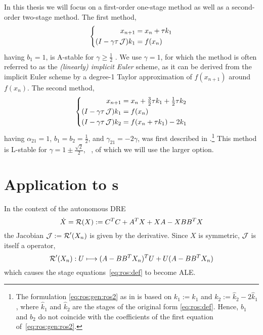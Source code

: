 In this thesis we will focus on a first-order one-stage method as well as a second-order two-stage method.
The first method, 
\begin{equation}
\label{eq:ros:gen:ros1}
\left\{
\begin{aligned}
  x_{n+1} &= x_n + \tau k_1 \\
  (I - \gamma\tau \operatorname{\mathcal J}) k_1 &= f(x_n)
\end{aligned}
\right.
\end{equation}
having $b_1=1$,
is A-stable for $\gamma \geq \frac{1}{2}$ \cite[Table~6.3]{HairerWanner2}.
We use $\gamma=1$, for which the method
is often referred to as the \emph{(linearly) implicit Euler} scheme,
as it can be derived from the implicit Euler scheme
by a degree-1 Taylor approximation of $f(x_{n+1})$ around $f(x_n)$.
The second method, 
\begin{equation}
\label{eq:ros:gen:ros2}
\left\{
\begin{aligned}
  x_{n+1} &= x_n + \tfrac{3}{2} \tau k_1 + \tfrac{1}{2} \tau k_2 \\
  (I - \gamma\tau \operatorname{\mathcal J}) k_1 &= f(x_n) \\
  (I - \gamma\tau \operatorname{\mathcal J}) k_2 &= f(x_n + \tau k_1) - 2k_1
\end{aligned}
\right.
\end{equation}
having $\alpha_{21}=1$, $b_1=b_2=\frac{1}{2}$, and $\gamma_{21}=-2\gamma$,
was first described in \cite{Verwer1999}.\footnote{%
  The formulation \eqref{eq:ros:gen:ros2} as in \cite[Equation~(3.4)]{Verwer1999}
  is based on $k_1 := \hat k_1$ and $k_2 := \hat k_2 - 2 \hat k_1$,
  where $\hat k_1$ and $\hat k_2$ are the stages of the original form \eqref{eq:ros:def}.
  Hence, $b_1$ and $b_2$ do not coincide with the coefficients of the first equation of~\eqref{eq:ros:gen:ros2}.
}
This method is L-stable for $\gamma = 1 \pm \frac{\sqrt{2}}{2}$,
\cf~\cite[Table~6.4]{HairerWanner2},
of which we will use the larger option.

\section{Application to s}

In the context of the autonomous \ac{DRE}
\begin{equation}
\label{eq:ros:DRE}
  \dot X = \operatorname{\mathcal R}(X) :=
  C^T C + A^T X + XA - X BB^T X
\end{equation}
the Jacobian $\operatorname{\mathcal J} := \operatorname{\mathcal R}'(X_n)$ is given by the \Frechet derivative.
Since $X$ is symmetric,
$\operatorname{\mathcal J}$ is itself a \Lyapunov operator,
\begin{equation}
  \operatorname{\mathcal R}'(X_n) : U \longmapsto (A - BB^T X_n)^T U + U (A - BB^T X_n)
\end{equation}
which causes the stage equations~\eqref{eq:ros:def} to become \ac{ALE}.

